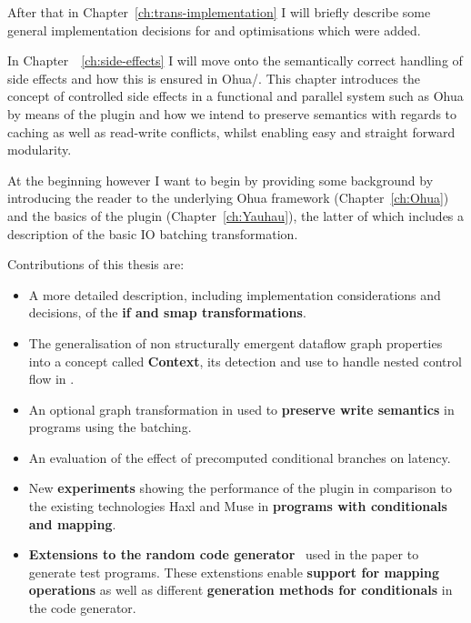 After that in Chapter~\ref{ch:trans-implementation} I will briefly describe some general implementation decisions for \yauhau{} and optimisations which were added.

In Chapter~~\ref{ch:side-effects} I will move onto the semantically correct handling of side effects and how this is ensured in Ohua/\yauhau{}.
This chapter introduces the concept of controlled side effects in a functional and parallel system such as Ohua by means of the \yauhau{} plugin and how we intend to preserve semantics with regards to caching as well as read-write conflicts, whilst enabling easy and straight forward modularity.

At the beginning however I want to begin by providing some background by introducing the reader to the underlying Ohua framework (Chapter~\ref{ch:Ohua}) and the basics of the \yauhau{} plugin (Chapter~\ref{ch:Yauhau}), the latter of which includes a description of the basic IO batching transformation.

Contributions of this thesis are:
\begin{itemize}
    \item A more detailed description, including implementation considerations and decisions, of the \textbf{if and smap transformations}.
    \item The generalisation of non structurally emergent dataflow graph properties into a concept called \textbf{Context}, its detection and use to handle nested control flow in \yauhau{}.
    \item An optional graph transformation in \yauhau{} used to \textbf{preserve write semantics} in programs using the \yauhau{} batching.
    \item An evaluation of the effect of precomputed conditional branches on latency.
    \item New \textbf{experiments} showing the performance of the \yauhau{} plugin in comparison to the existing technologies Haxl and Muse in \textbf{programs with conditionals and mapping}.
    \item \textbf{Extensions to the random code generator}~\cite{Goens-rand-code-graph} used in the \yauhau{} paper to generate test programs.
    These extenstions enable \textbf{support for mapping operations} as well as different \textbf{generation methods for conditionals} in the code generator.
\end{itemize}

